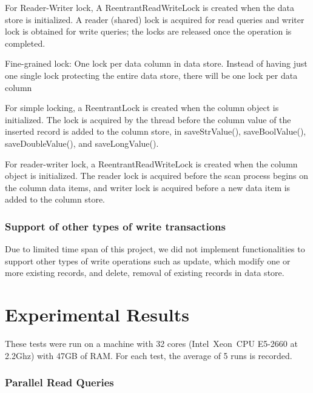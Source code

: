 \documentclass[11pt,journal,compsoc]{IEEEtran}
\begin{document}
For Reader-Writer lock, A ReentrantReadWriteLock is created when the data store is initialized. A reader (shared) lock is acquired for read queries and writer lock is obtained for write queries; the locks are released once the operation is completed.
 
Fine-grained lock: One lock per data column in data store. Instead of having just one single lock protecting the entire data store, there will be one lock per data column
 
For simple locking, a ReentrantLock is created when the column object is initialized. The lock is acquired by the thread before the column value of the inserted record is added to the column store, in saveStrValue(), saveBoolValue(), saveDoubleValue(), and saveLongValue().
 
For reader-writer lock,  a ReentrantReadWriteLock is created when the column object is initialized. The reader lock is acquired before the scan process begins on the column data items, and writer lock is acquired before a new data item is added to the column store.



\subsubsection{Support of other types of write transactions}
Due to limited time span of this project, we did not implement functionalities to support other types of write operations such as update, which modify one or more existing records, and delete, removal of existing records in data store.


\section{Experimental Results}
These tests were run on a machine with 32 cores (Intel~\textregistered Xeon~\textregistered CPU E5-2660 at 2.2Ghz) with 47GB of RAM. For each test, the average of 5 runs is recorded.

\subsubsection{Parallel Read Queries}
\end{document}

